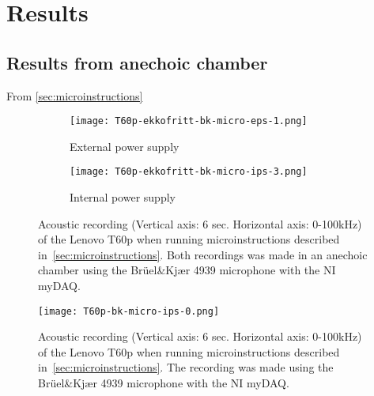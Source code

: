 \chapter{Results}
\label{chp:results} 

\section{Results from anechoic chamber}\label{sec:anechoic_chamber}

From \autoref{sec:microinstructions} 
\begin{wrapfigure}{r}{1\textwidth}
	\begin{subfigure}{1\textwidth}
	    \centering
	    \texttt{[image: T60p-ekkofritt-bk-micro-eps-1.png]}
	    \caption{External power supply}
	    \label{fig:T60p-ekkofritt-bk-micro-eps-1}
    \end{subfigure}
    \begin{subfigure}{1\textwidth}
	    \centering
    	\texttt{[image: T60p-ekkofritt-bk-micro-ips-3.png]}
    	\caption{Internal power supply}
    	\label{fig:T60p-ekkofritt-bk-micro-ips-3}
    \end{subfigure}
    \caption{Acoustic recording (Vertical axis: 6 sec. Horizontal axis: 0-100kHz) of the Lenovo T60p when running microinstructions described in~\autoref{sec:microinstructions}. Both recordings was made in an anechoic chamber using the Brüel\&Kjær 4939 microphone with the NI myDAQ. }
	\label{fig:T60p-ekkofritt-bk-cpuload}
\end{wrapfigure}
\begin{wrapfigure}{r}{1\textwidth}
    \centering
    \texttt{[image: T60p-bk-micro-ips-0.png]}
    \caption{Acoustic recording (Vertical axis: 6 sec. Horizontal axis: 0-100kHz) of the Lenovo T60p when running microinstructions described in~\autoref{sec:microinstructions}. The recording was made using the Brüel\&Kjær 4939 microphone with the NI myDAQ. }
    \label{fig:T60p-bk-micro-ips-0}
\end{wrapfigure}

